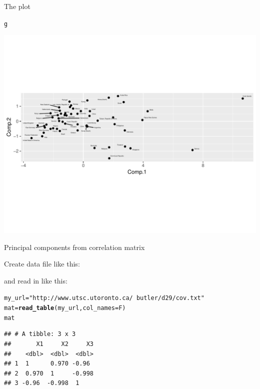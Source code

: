 \documentclass[unknownkeysallowed]{beamer}\usepackage[]{graphicx}\usepackage[]{color}
\makeatletter
\def\maxwidth{ %
  \ifdim\Gin@nat@width>\linewidth
    \linewidth
  \else
    \Gin@nat@width
  \fi
}
\newcommand{\hlstr}[1]{\textcolor[rgb]{0.192,0.494,0.8}{#1}}%
\newcommand{\hlstd}[1]{\textcolor[rgb]{0.345,0.345,0.345}{#1}}%
\newcommand{\hlkwb}[1]{\textcolor[rgb]{0.69,0.353,0.396}{#1}}%
\newcommand{\hlkwc}[1]{\textcolor[rgb]{0.333,0.667,0.333}{#1}}%
\newcommand{\hlkwd}[1]{\textcolor[rgb]{0.737,0.353,0.396}{\textbf{#1}}}%
\newenvironment{kframe}{%
 \def\at@end@of@kframe{}%
 \ifinner\ifhmode%
  \def\at@end@of@kframe{\end{minipage}}%
  \begin{minipage}{\columnwidth}%
 \fi\fi%
 \def\FrameCommand##1{\hskip\@totalleftmargin \hskip-\fboxsep
 \colorbox{shadecolor}{##1}\hskip-\fboxsep
     \hskip-\linewidth \hskip-\@totalleftmargin \hskip\columnwidth}%
 \MakeFramed {\advance\hsize-\width
   \@totalleftmargin\z@ \linewidth\hsize
   \@setminipage}}%
 {\par\unskip\endMakeFramed%
 \at@end@of@kframe}
\newenvironment{knitrout}{}{} %
\makeatother
\begin{document}
\begin{frame}[fragile]{The plot}

\begin{knitrout}
\color{fgcolor}\begin{kframe}
\begin{alltt}
\hlstd{g}
\end{alltt}
\end{kframe}
\includegraphics[width=\maxwidth]{figure/unnamed-chunk-464-1} 

\end{knitrout}

\end{frame}

\begin{frame}[fragile]{Principal components from correlation matrix}
  
  Create data file like this:

  
  
  
  and read in like this:
  
\begin{knitrout}
\color{fgcolor}\begin{kframe}
\begin{alltt}
\hlstd{my_url}\hlkwb{=}\hlstr{"http://www.utsc.utoronto.ca/~butler/d29/cov.txt"}
\hlstd{mat}\hlkwb{=}\hlkwd{read_table}\hlstd{(my_url,}\hlkwc{col_names}\hlstd{=F)}
\hlstd{mat}
\end{alltt}
\begin{verbatim}
## # A tibble: 3 x 3
##       X1     X2     X3
##    <dbl>  <dbl>  <dbl>
## 1  1      0.970 -0.96 
## 2  0.970  1     -0.998
## 3 -0.96  -0.998  1
\end{verbatim}
\end{kframe}
\end{knitrout}
  
\end{frame}
\end{document}
